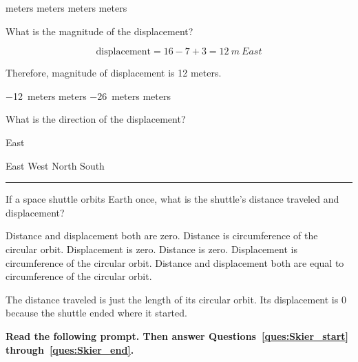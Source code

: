 \documentclass[]{exam}
\begin{document}
\begin{questions}
\begin{questions}
\begin{choices}
 meters
 meters
 meters
 meters
\end{choices}

\question
What is the magnitude of the displacement?

\begin{solution}
\begin{equation*}
  \mathrm{displacement} = 16 - 7 + 3 = \SI{12}{m \ East}  
\end{equation*}

Therefore, magnitude of displacement is 12 meters.
\end{solution}

\begin{choices}
\choice \SI{-12}{meters}
 meters
\choice \SI{-26}{meters}
 meters
\end{choices}

\question \label{ques:cat_end}
What is the direction of the displacement?

\begin{solution}
East
\end{solution}

\begin{choices}
\CorrectChoice East
\choice West
\choice North
\choice South
\end{choices}

\vspace{1em} \hrule

\question
If a space shuttle orbits Earth once, what is the shuttle’s distance traveled and displacement?

\begin{choices}
\choice Distance and displacement both are zero.
\CorrectChoice Distance is circumference of the circular orbit. Displacement is zero.
\choice Distance is zero. Displacement is circumference of the circular orbit.
\choice Distance and displacement both are equal to circumference of the circular orbit.
\end{choices}

\begin{solution}
The distance traveled is just the length of its circular orbit. Its displacement is 0 because the shuttle ended where it started.
\end{solution}

\begin{EnvUplevel}
\textbf{Read the following prompt. Then answer Questions~\ref{ques:Skier_start} through~\ref{ques:Skier_end}.}


\end{EnvUplevel}
\end{questions}
\end{questions}
\end{document}

